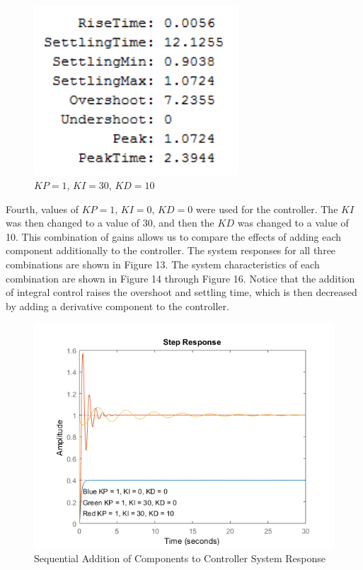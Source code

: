 \documentclass[12pt]{article}
\begin{document}
\bigskip

\begin{figure}[h!] %
   \centering
   \includegraphics[width=3in]{3_13010.png} 
   \caption{$KP = 1$, $KI = 30$, $KD = 10$}
   \label{fig:example}
\end{figure}

\bigskip

Fourth, values of $KP=1$, $KI=0$, $KD=0$ were used for the controller. The $KI$ was then changed to a value of 30, and then the $KD$ was changed to a value of 10. This combination of gains allows us to compare the effects of adding each component additionally to the controller. The system responses for all three combinations are shown in Figure 13. The system characteristics of each combination are shown in Figure 14 through Figure 16. Notice that the addition of integral control raises the overshoot and settling time, which is then decreased by adding a derivative component to the controller.

\newpage

\begin{figure}[h!] %
   \centering
   \includegraphics[width=\linewidth]{part_4_response.png} 
   \caption{Sequential Addition of Components to Controller System Response}
   \label{fig:example}
\end{figure}
\end{document}
